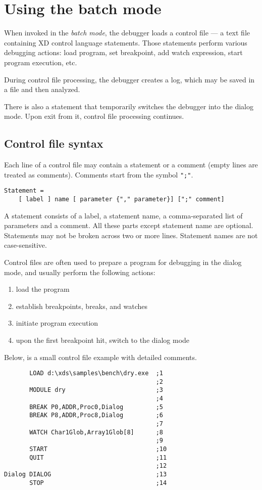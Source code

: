 \chapter{Using the batch mode}
\label{batch}

When invoked in the {\em batch mode}, the debugger loads
a control file --- a text file containing XD control language
statements. Those statements perform various debugging actions:
load program, set breakpoint, add watch expression, start
program execution, etc.

During control file processing, the debugger creates a log,
which may be saved in a file and then analyzed.

There is also a statement that temporarily switches the
debugger into the dialog mode. Upon exit from it, control
file processing continues.

\section{Control file syntax}

Each line of a control file may contain a statement
or a comment (empty lines are treated as comments).
Comments start from the symbol \verb'";"'.

\begin{verbatim}
Statement =
    [ label ] name [ parameter {"," parameter}] [";" comment]
\end{verbatim}

A statement consists of a label, a statement name,
a comma-separated list of parameters and a comment.
All these parts except statement name are optional.
Statements may not be broken across two or more lines.
Statement names are not case-sensitive.

Control files are often used to prepare a
program for debugging in the dialog mode, and
usually perform the following actions:
\begin{enumerate}
\item load the program
\item establish breakpoints, breaks, and watches
\item initiate program execution
\item upon the first breakpoint hit, switch to the dialog mode
\end{enumerate}
\pagebreak
Below, is a small control file example with detailed comments.

\begin{verbatim}
       LOAD d:\xds\samples\bench\dry.exe  ;1
                                          ;2
       MODULE dry                         ;3
                                          ;4
       BREAK P0,ADDR,Proc0,Dialog         ;5
       BREAK P8,ADDR,Proc8,Dialog         ;6
                                          ;7
       WATCH Char1Glob,Array1Glob[8]      ;8
                                          ;9
       START                              ;10
       QUIT                               ;11
                                          ;12
Dialog DIALOG                             ;13
       STOP                               ;14
\end{verbatim}

